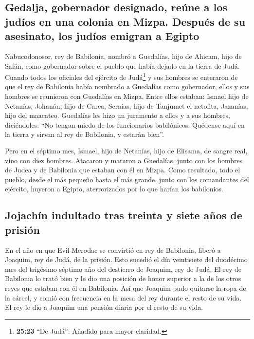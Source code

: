 \hypertarget{gedalja-gobernador-designado-reuxfane-a-los-juduxedos-en-una-colonia-en-mizpa.-despuuxe9s-de-su-asesinato-los-juduxedos-emigran-a-egipto}{%
\subsection{Gedalja, gobernador designado, reúne a los judíos en una
colonia en Mizpa. Después de su asesinato, los judíos emigran a
Egipto}\label{gedalja-gobernador-designado-reuxfane-a-los-juduxedos-en-una-colonia-en-mizpa.-despuuxe9s-de-su-asesinato-los-juduxedos-emigran-a-egipto}}

 Nabucodonosor, rey de Babilonia, nombró a Guedalías,
hijo de Ahicam, hijo de Safán, como gobernador sobre el pueblo que había
dejado en la tierra de Judá.  Cuando todos los oficiales
del ejército de Judá\footnote{\textbf{25:23} ``De Judá'': Añadido para
  mayor claridad.} y sus hombres se enteraron de que el rey de Babilonia
había nombrado a Guedalías como gobernador, ellos y sus hombres se
reunieron con Guedalías en Mizpa. Entre ellos estaban: Ismael hijo de
Netanías, Johanán, hijo de Carea, Seraías, hijo de Tanjumet el netofita,
Jazanías, hijo del maacateo.  Guedalías les hizo un
juramento a ellos y a sus hombres, diciéndoles: ``No tengan miedo de los
funcionarios babilónicos. Quédense aquí en la tierra y sirvan al rey de
Babilonia, y estarán bien''.

 Pero en el séptimo mes, Ismael, hijo de Netanías, hijo
de Elisama, de sangre real, vino con diez hombres. Atacaron y mataron a
Guedalías, junto con los hombres de Judea y de Babilonia que estaban con
él en Mizpa.  Como resultado, todo el pueblo, desde el
más pequeño hasta el más grande, junto con los comandantes del ejército,
huyeron a Egipto, aterrorizados por lo que harían los babilonios.

\hypertarget{jojachuxedn-indultado-tras-treinta-y-siete-auxf1os-de-prisiuxf3n}{%
\subsection{Jojachín indultado tras treinta y siete años de
prisión}\label{jojachuxedn-indultado-tras-treinta-y-siete-auxf1os-de-prisiuxf3n}}

 En el año en que Evil-Merodac se convirtió en rey de
Babilonia, liberó a Joaquim, rey de Judá, de la prisión. Esto sucedió el
día veintisiete del duodécimo mes del trigésimo séptimo año del
destierro de Joaquim, rey de Judá.  El rey de Babilonia
lo trató bien y le dio una posición de honor superior a la de los otros
reyes que estaban con él en Babilonia.  Así que Joaquim
pudo quitarse la ropa de la cárcel, y comió con frecuencia en la mesa
del rey durante el resto de su vida.  El rey le dio a
Joaquim una pensión diaria por el resto de su vida.
